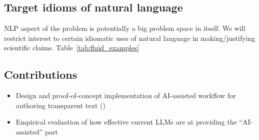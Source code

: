 

\subsection{Target idioms of natural language}

NLP aspect of the problem is potentially a big problem space in itself. We will restrict interest to certain
idiomatic uses of natural language in making/justifying scientific claims. Table~\ref{tab:fluid_examples}



\subsection{Contributions}

\begin{itemize}
    \item Design and proof-of-concept implementation of AI-assisted workflow for authoring transparent text
    ()
    \item Empirical evaluation of how effective current LLMs are at providing the ``AI-assisted'' part
\end{itemize}
